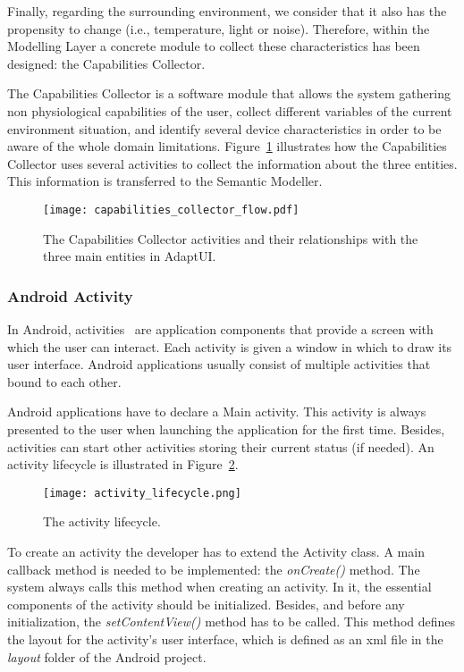 Finally, regarding the surrounding environment, we consider that it also has the 
propensity to change (i.e., temperature, light or noise). Therefore, within the 
Modelling Layer a concrete module to collect these characteristics has been 
designed: the Capabilities Collector.

The Capabilities Collector is a software module that allows the system gathering 
non physiological capabilities of the user, collect different variables of the 
current environment situation, and identify several device characteristics in 
order to be aware of the whole domain limitations. Figure~\ref{fig:capabilities_collector_flow}
illustrates how the Capabilities Collector uses several activities to collect
the information about the three entities. This information is transferred to the
Semantic Modeller.

\begin{figure}
\centering
\texttt{[image: capabilities\_collector\_flow.pdf]}
\caption{The Capabilities Collector activities and their relationships with the
three main entities in AdaptUI.}
\label{fig:capabilities_collector_flow}
\end{figure}


\subsubsection{Android Activity}
\label{sec:activities}

In Android, activities~\citep{activities}
are application components that provide a screen with which the user can interact.
Each activity is given a window in which to draw its user interface. Android
applications usually consist of multiple activities that bound to each other. 

Android applications have to declare a Main activity. This activity is always
presented to the user when launching the application for the first time. Besides,
activities can start other activities storing their current status (if needed).
An activity lifecycle is illustrated in Figure~\ref{fig:activity_lifecycle}.

\begin{figure}[H]
\centering
\texttt{[image: activity\_lifecycle.png]}
\caption{The activity lifecycle.}
\label{fig:activity_lifecycle}
\end{figure}

To create an activity the developer has to extend the Activity class. A main
callback method is needed to be implemented: the \textit{onCreate()} method.
The system always calls this method when creating an activity. In it, the
essential components of the activity should be initialized. Besides, and before
any initialization, the \textit{setContentView()} method has to be called. This
method defines the layout for the activity's user interface, which is defined as
an \ac{xml} file in the \textit{layout} folder of the Android project.

